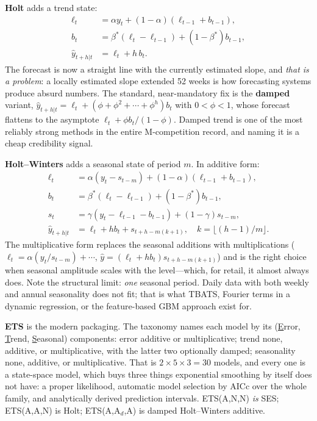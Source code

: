 \textbf{Holt} adds a trend state:
\begin{align}
\ell_t &= \alpha y_t + (1-\alpha)(\ell_{t-1} + b_{t-1}), \\
b_t &= \beta^*(\ell_t - \ell_{t-1}) + (1-\beta^*) b_{t-1}, \\
\hat{y}_{t+h|t} &= \ell_t + h\,b_t .
\end{align}
The forecast is now a straight line with the currently estimated slope, and \emph{that is a problem}: a locally estimated slope extended 52 weeks is how forecasting systems produce absurd numbers. The standard, near-mandatory fix is the \textbf{damped} variant, $\hat{y}_{t+h|t} = \ell_t + (\phi + \phi^2 + \cdots + \phi^h) b_t$ with $0 < \phi < 1$, whose forecast flattens to the asymptote $\ell_t + \phi b_t/(1-\phi)$. Damped trend is one of the most reliably strong methods in the entire M-competition record, and naming it is a cheap credibility signal.

\textbf{Holt--Winters} adds a seasonal state of period $m$. In additive form:
\begin{align}
\ell_t &= \alpha (y_t - s_{t-m}) + (1-\alpha)(\ell_{t-1} + b_{t-1}), \\
b_t &= \beta^*(\ell_t - \ell_{t-1}) + (1-\beta^*)b_{t-1}, \\
s_t &= \gamma (y_t - \ell_{t-1} - b_{t-1}) + (1-\gamma)s_{t-m}, \\
\hat{y}_{t+h|t} &= \ell_t + h b_t + s_{t+h-m(k+1)}, \quad k = \lfloor (h-1)/m \rfloor .
\end{align}
The multiplicative form replaces the seasonal additions with multiplications ($\ell_t = \alpha(y_t/s_{t-m}) + \cdots$, $\hat{y} = (\ell_t + hb_t)s_{t+h-m(k+1)}$) and is the right choice when seasonal amplitude scales with the level---which, for retail, it almost always does. Note the structural limit: \emph{one} seasonal period. Daily data with both weekly and annual seasonality does not fit; that is what TBATS, Fourier terms in a dynamic regression, or the feature-based GBM approach exist for.

\textbf{ETS} is the modern packaging. The taxonomy names each model by its (\underline{E}rror, \underline{T}rend, \underline{S}easonal) components: error additive or multiplicative; trend none, additive, or multiplicative, with the latter two optionally damped; seasonality none, additive, or multiplicative. That is $2 \times 5 \times 3 = 30$ models, and every one is a state-space model, which buys three things exponential smoothing by itself does not have: a proper likelihood, automatic model selection by AICc over the whole family, and analytically derived prediction intervals. ETS(A,N,N) \emph{is} SES; ETS(A,A,N) is Holt; ETS(A,A$_d$,A) is damped Holt--Winters additive.

